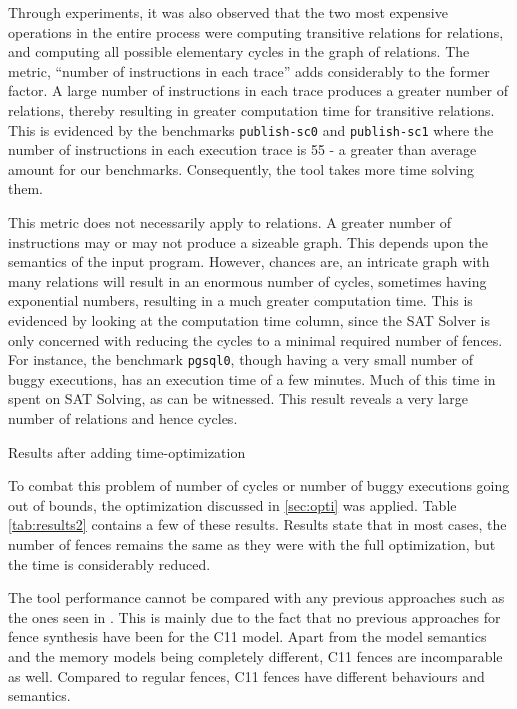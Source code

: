 Through experiments, it was also observed that the two most expensive 
operations in the entire process were computing transitive relations for \lhb
relations, and computing all possible elementary cycles in the graph of \lto
relations. The metric, ``number of instructions in each trace'' adds
considerably to the former factor. A large number of instructions in each
trace produces a greater number of \lhb relations, thereby resulting in
greater computation time for transitive relations. This is evidenced by the benchmarks
\texttt{publish-sc0} and \texttt{publish-sc1} where the number of instructions in each
execution trace is 55 - a greater than average amount for our benchmarks.
Consequently, the tool takes more time solving them.

This metric does not necessarily apply to \lto relations.
A greater number of instructions may or may not produce a sizeable \lto graph.
This depends upon the semantics of the input program. However, chances are,
an intricate graph with many \lto relations will result in an enormous number of cycles, 
sometimes having exponential numbers, resulting in a much greater
computation time. This is evidenced by looking at the \z computation 
time column, since the SAT Solver is only concerned with reducing the cycles
to a minimal required number of fences. For instance, the benchmark \texttt{pgsql0}, though having 
a very small number of buggy executions, has an execution time of a few minutes. Much
of this time in spent on SAT Solving, as can be witnessed. This result reveals 
a very large number of \lto relations and hence cycles.

\begin{table}
\begin{center}
	
	\caption{Results after adding time-optimization}
	\label{tab:results2}
\end{center}
\end{table}

To combat this problem of number of cycles or number of buggy executions going out of bounds,
the optimization discussed in \ref{sec:opti} was applied.
Table \ref{tab:results2} contains a few of these results. Results state that
in most cases, the number of fences remains the same as they were with the 
full optimization, but the time is considerably reduced.

The tool performance cannot be compared with any previous approaches such as
the ones seen in \cite{ref1,ref2,etc}. This is mainly due to the fact that
no previous approaches for fence synthesis have been for the C11 model. Apart
from the model semantics and the memory models being completely different,
C11 fences are incomparable as well. Compared to regular fences, C11 fences have
different behaviours and semantics.

